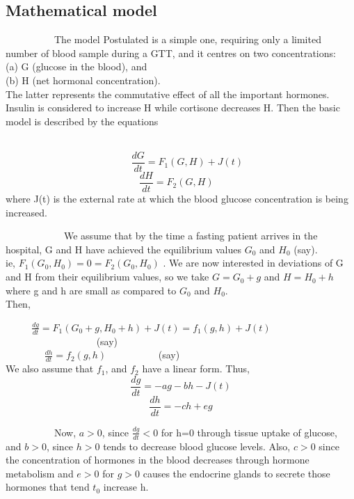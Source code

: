 \subsection*{Mathematical model}
\par ~~~~~~~~~~The model Postulated is a simple one, requiring only a limited number of blood sample during a GTT, and it centres on two concentrations: \\
(a) G (glucose in the blood), and \\
(b) H (net hormonal concentration). \\
\linebreak
The latter represents the commutative effect of all the important hormones. Insulin  is considered to increase H while cortisone decreases H. Then the basic model is described by the equations     

~~~~$$~~~~~~\frac{dG}{dt}=F_{1}(G,H)+J(t)$$
$$\frac{dH}{dt}=F_{2}(G,H)~~~~$$ 
where J(t) is the external rate at which the blood glucose concentration is being increased.
\par ~~~~~~~~~~~~We assume that by the time a fasting patient arrives in the hospital, G and H have achieved the equilibrium values $G_{0}$ and $H_{0}$ (say).
\\ ie,           $F_{1}(G_{0},H_{0})=0=F_{2}(G_{0},H_{0})$  .
We are now interested in deviations of G and H from their equilibrium values, so we take $G=G_{0}+g$ and $H=H_{0}+h$ where g and h are small as compared to $G_{0}$ and $H_{0}$.\\ Then,

$~~~~~~~~~~~~\frac{dg}{dt}=F_{1}(G_{0}+g,H_{0}+h)+J(t) 
=f_{1}(g,h)+J(t)$      ~~~~~~~~~~~~~~~~~~            (say) \\

$~~~~~~~~~~~~~~~~~~\frac{dh}{dt}=f_{2}(g,h)$~~~~~~~~~~   (say) \\

We also assume that $f_{1}$, and $f_{2}$ have a linear form.
Thus,
$$\dfrac{dg}{dt}=-ag-bh-J(t)$$
$$\frac{dh}{dt}=-ch+eg$$

\par ~~~~~~~~~~Now, $a>0$, since $\frac{dg}{dt}<0$ for h=0 through tissue uptake of glucose, and $b>0$, since $h>0$ tends to decrease blood glucose levels. Also, $c>0$ since the concentration of hormones in the blood decreases through hormone metabolism and $e>0$ for $g>0$ causes the endocrine glands to secrete those hormones that tend $t_{0}$ increase h.


